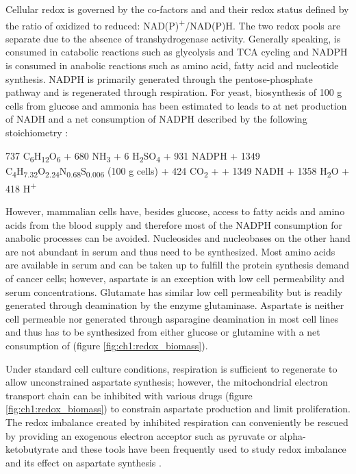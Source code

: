 Cellular redox is governed by the co-factors \NADP{} and \NAD{} and their redox status defined by the ratio of oxidized to reduced: NAD(P)\textsuperscript{+}/NAD(P)H.
The two redox pools are separate due to the absence of transhydrogenase activity.
Generally speaking, \NAD{} is consumed in catabolic reactions such as glycolysis and TCA cycling and NADPH is consumed in anabolic reactions such as amino acid, fatty acid and nucleotide synthesis.
NADPH is primarily generated through the pentose-phosphate pathway \cite{Chen2019-ex, Ghergurovich2020-sh, Zhang2021-mg} and \NAD{} is regenerated through respiration.
For yeast, biosynthesis of 100 g cells from glucose and ammonia has been estimated to leads to at net production of NADH and a net consumption of NADPH described by the following stoichiometry \cite{Bruinenberg1983-tn, Van_Dijken1986-zp}:
\begin{center}
737 C\textsubscript{6}H\textsubscript{12}O\textsubscript{6} + 680 NH\textsubscript{3} + 6 H\textsubscript{2}SO\textsubscript{4} + 931 NADPH + 1349 \NAD{} \Rightarrow {} C\textsubscript{4}H\textsubscript{7.32}O\textsubscript{2.24}N\textsubscript{0.68}S\textsubscript{0.006} (100 g cells) + 424 CO\textsubscript{2} +  \NADP{} + 1349 NADH + 1358 H\textsubscript{2}O + 418 H\textsuperscript{+}
\end{center}

However, mammalian cells have, besides glucose, access to fatty acids and amino acids from the blood supply and therefore most of the NADPH consumption for anabolic processes can be avoided.
Nucleosides and nucleobases on the other hand are not abundant in serum \cite{Traut1994-vu} and thus need to be synthesized.
Most amino acids are available in serum and can be taken up to fulfill the protein synthesis demand of cancer cells; however, aspartate is an exception with low cell permeability and serum concentrations.
Glutamate has similar low cell permeability but is readily generated through deamination by the enzyme glutaminase.
Aspartate is neither cell permeable nor generated through asparagine deamination in most cell lines \cite{Sullivan2018-gz} and thus has to be synthesized from either glucose or glutamine with a net consumption of \NAD{} (figure \ref{fig:ch1:redox_biomass}).

Under standard cell culture conditions, respiration is sufficient to regenerate \NAD{} to allow unconstrained aspartate synthesis; however, the mitochondrial electron transport chain can be inhibited with various drugs (figure \ref{fig:ch1:redox_biomass}) to constrain aspartate production and limit proliferation.
The redox imbalance created by inhibited respiration can conveniently be rescued by providing an exogenous electron acceptor such as pyruvate or alpha-ketobutyrate and these tools have been frequently used to study redox imbalance and its effect on aspartate synthesis \cite{Birsoy2014-em, Sullivan2015-xf, Birsoy2015-pg, Gui2016-ca, Garcia-Bermudez2018-mj, Alkan2018-zv, Diehl2019-um, Yang2020-fs, Luengo2021-kb, Garcia-Bermudez2022-qn}.


